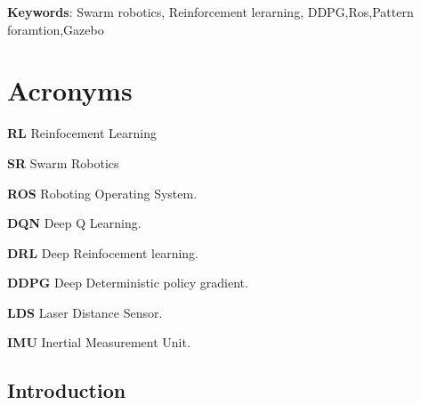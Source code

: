 \documentclass[12pt]{extarticle}
\begin{document}
\textbf{Keywords}: Swarm robotics, Reinforcement lerarning, DDPG,Ros,Pattern foramtion,Gazebo

\newpage
\thispagestyle{empty}
{
\hypersetup{linkcolor=false}
\tableofcontents

}




\newpage
\listoffigures
\clearpage

\newpage
\section*{Acronyms}

\hspace{0.5cm} \textbf{RL}  Reinfocement Learning

\vspace{0.2cm}

\textbf{SR} Swarm Robotics

\vspace{0.2cm}
\textbf{ROS} Roboting Operating System.

\vspace{0.2cm}

\textbf{DQN} Deep Q Learning.

\vspace{0.2cm}

\textbf{DRL} Deep Reinfocement learning.

\vspace{0.2cm}



\textbf{DDPG} Deep Deterministic policy gradient.

\vspace{0.2cm}

\textbf{LDS} Laser Distance Sensor.

\vspace{0.2cm}

\textbf{IMU} Inertial Measurement Unit.

\vspace{0.2cm}



  








\newpage
\pagebreak
\hspace{0pt}
\vfill
\begin{center}
\section{Introduction}
\end{center}
\vfill
\hspace{0pt}
\pagebreak
\end{document}
